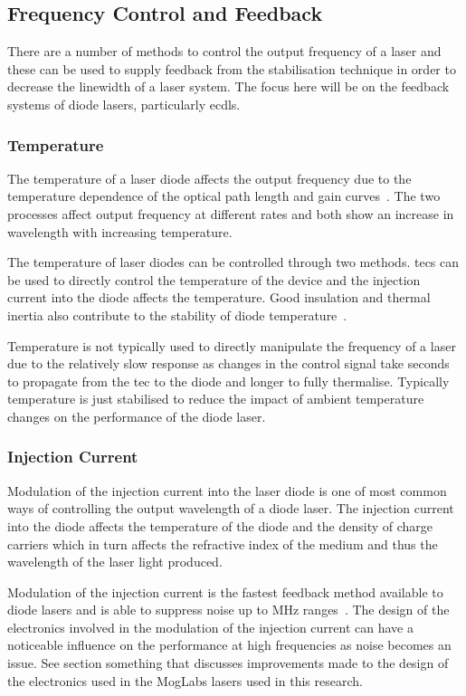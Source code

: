 \subsection{Frequency Control and Feedback}

There are a number of methods to control the output frequency of a laser and these can be used to supply feedback from the stabilisation technique in order to decrease the linewidth of a laser system.
The focus here will be on the feedback systems of diode lasers, particularly \glspl{ecdl}.

\subsubsection{Temperature}
The temperature of a laser diode affects the output frequency due to the temperature dependence of the optical path length and gain curves~\cite{wieman_using_1991}.
The two processes affect output frequency at different rates and both show an increase in wavelength with increasing temperature.

The temperature of laser diodes can be controlled through two methods. \Glspl{tec} can be used to directly control the temperature of the device and the injection current into the diode affects the temperature. Good insulation and thermal inertia also contribute to the stability of diode temperature~\cite{saliba_cold_2011}.

Temperature is not typically used to directly manipulate the frequency of a laser due to the relatively slow response as changes in the control signal take seconds to propagate from the \gls{tec} to the diode and longer to fully thermalise.
Typically temperature is just stabilised to reduce the impact of ambient temperature changes on the performance of the diode laser.

\subsubsection{Injection Current}
Modulation of the injection current into the laser diode is one of most common ways of controlling the output wavelength of a diode laser.
The injection current into the diode affects the temperature of the diode and the density of charge carriers which in turn affects the refractive index of the medium and thus the wavelength of the laser light produced.

Modulation of the injection current is the fastest feedback method available to diode lasers and is able to suppress noise up to \unit{MHz} ranges~\cite{ludlow_compact_2007,torrance_sub-kilohertz_2016}.
The design of the electronics involved in the modulation of the injection current can have a noticeable influence on the performance at high frequencies as noise becomes an issue.
{\color{red}See section something that discusses improvements made to the design of the electronics used in the MogLabs lasers used in this research.}

